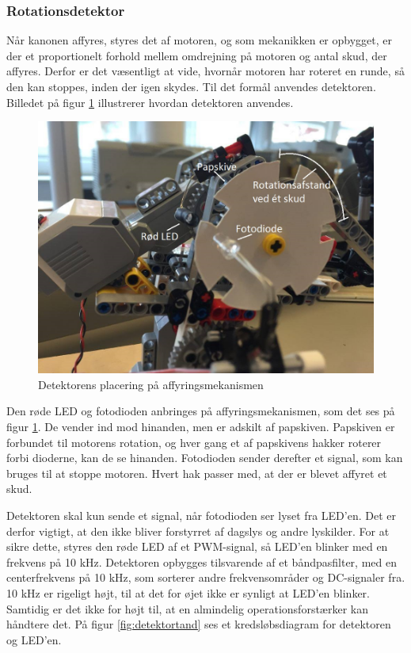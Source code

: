 \subsubsection{Rotationsdetektor}
Når kanonen affyres, styres det af motoren, og som mekanikken er opbygget, er der et proportionelt forhold mellem omdrejning på motoren og antal skud, der affyres. Derfor er det væsentligt at vide, hvornår motoren har roteret en runde, så den kan stoppes, inden der igen skydes. Til det formål anvendes detektoren. Billedet på figur \ref{fig:detektor} illustrerer hvordan detektoren anvendes.

\begin{figure}[H]
	\centering
	\includegraphics[width=\textwidth]{Afsnit/DesignOgImplementering/images/detektor}
	\caption{Detektorens placering på affyringsmekanismen}
	\label{fig:detektor}
\end{figure}

Den røde LED og fotodioden anbringes på affyringsmekanismen, som det ses på figur \ref{fig:detektor}. De vender ind mod hinanden, men er adskilt af papskiven. Papskiven er forbundet til motorens rotation, og hver gang et af papskivens hakker roterer forbi dioderne, kan de se hinanden. Fotodioden sender derefter et signal, som kan bruges til at stoppe motoren. Hvert hak passer med, at der er blevet affyret et skud.  

Detektoren skal kun sende et signal, når fotodioden ser lyset fra LED'en. Det er derfor vigtigt, at den ikke bliver forstyrret af dagslys og andre lyskilder. For at sikre dette, styres den røde LED af et PWM-signal, så LED'en blinker med en frekvens på 10 kHz. Detektoren opbygges tilsvarende af et båndpasfilter, med en centerfrekvens på 10 kHz, som sorterer andre frekvensområder og DC-signaler fra. 10 kHz er rigeligt højt, til at det for øjet ikke er synligt at LED'en blinker. Samtidig er det ikke for højt til, at en almindelig operationsforstærker kan håndtere det. På figur \ref*{fig:detektortand} ses et kredsløbsdiagram for detektoren og LED'en.


